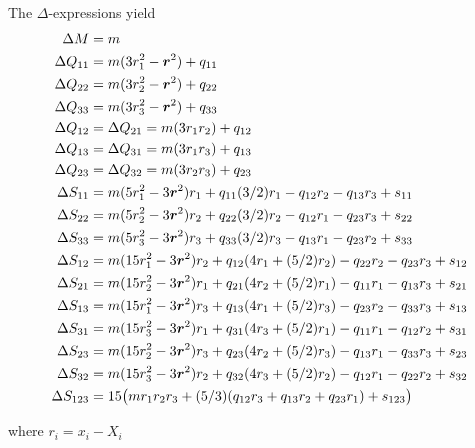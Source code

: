 The $\Delta$-expressions yield
\begin{align*}
\Delta M &= m \\
\Delta Q_{11} &= m (3 r_1^2 - \boldsymbol{r}^2) + q_{11} \nonumber \\
\Delta Q_{22} &= m (3 r_2^2 - \boldsymbol{r}^2) + q_{22} \nonumber \\
\Delta Q_{33} &= m (3 r_3^2 - \boldsymbol{r}^2) + q_{33} \nonumber \\
\Delta Q_{12} &= \Delta Q_{21} = m ( 3 r_1 r_2 ) + q_{12} \nonumber \\
\Delta Q_{13} &= \Delta Q_{31} = m ( 3 r_1 r_3 ) + q_{13} \nonumber \\
\Delta Q_{23} &= \Delta Q_{32} = m ( 3 r_2 r_3 ) + q_{23} \nonumber \\
\Delta S_{11} &= m ( 5 r_1^2 - 3 \boldsymbol{r}^2 ) r_1 + q_{11} (3/2) r_1 - q_{12} r_2 - q_{13} r_3 + s_{11} \nonumber \\
\Delta S_{22} &= m ( 5 r_2^2 - 3 \boldsymbol{r}^2 ) r_2 + q_{22} (3/2) r_2 - q_{12} r_1 - q_{23} r_3 + s_{22} \nonumber \\
\Delta S_{33} &= m ( 5 r_3^2 - 3 \boldsymbol{r}^2 ) r_3 + q_{33} (3/2) r_3 - q_{13} r_1 - q_{23} r_2 + s_{33} \nonumber \\
\Delta S_{12} &= m ( 15 r_1^2 - 3 \boldsymbol{r}^2 ) r_2 + q_{12} ( 4 r_1 + (5/2) r_2) - q_{22} r_2 - q_{23} r_3 + s_{12} \\
\Delta S_{21} &= m ( 15 r_2^2 - 3 \boldsymbol{r}^2 ) r_1 + q_{21} ( 4 r_2 + (5/2) r_1) - q_{11} r_1 - q_{13} r_3 + s_{21} \\
\Delta S_{13} &= m ( 15 r_1^2 - 3 \boldsymbol{r}^2 ) r_3 + q_{13} ( 4 r_1 + (5/2) r_3) - q_{23} r_2 - q_{33} r_3 + s_{13} \\
\Delta S_{31} &= m ( 15 r_3^2 - 3 \boldsymbol{r}^2 ) r_1 + q_{31} ( 4 r_3 + (5/2) r_1) - q_{11} r_1 - q_{12} r_2 + s_{31} \\
\Delta S_{23} &= m ( 15 r_2^2 - 3 \boldsymbol{r}^2 ) r_3 + q_{23} ( 4 r_2 + (5/2) r_3) - q_{13} r_1 - q_{33} r_3 + s_{23} \\
\Delta S_{32} &= m ( 15 r_3^2 - 3 \boldsymbol{r}^2 ) r_2 + q_{32} ( 4 r_3 + (5/2) r_2) - q_{12} r_1 - q_{22} r_2 + s_{32} \\
\Delta S_{123} &=15 \big( m r_1 r_2 r_3 + (5 / 3) ( q_{12}  r_3 + q_{13} r_2 + q_{23} r_1) + s_{123} \big)
\end{align*}

where $r_i = x_i - X_i$